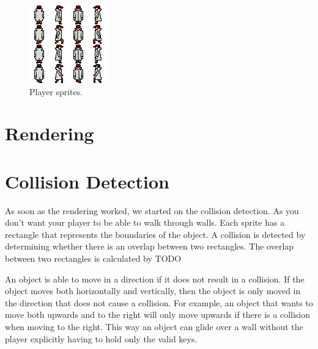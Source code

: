 \documentclass[a4paper,pdf,12pt]{article}
\begin{document}
\begin{figure}[h!]
\centering
\includegraphics[width = 1.0 \textwidth]{../img/player.png}
\caption{Player sprites.}
\label{fig:player}
\end{figure}

\section{Rendering}
\label{sec:Rendering}

\section{Collision Detection}
\label{sec:Collision Detection}
As soon as the rendering worked, we started on the collision detection. As you don't want your player to be able to walk through walls. Each sprite has a rectangle that represents the boundaries of the object. A collision is detected by determining whether there is an overlap between two rectangles. The overlap between two rectangles is calculated by TODO

An object is able to move in a direction if it does not result in a collision. If the object moves both horizontally and vertically, then the object is only moved in the direction that does not cause a collision. For example, an object that wants to move both upwards and to the right will only move upwards if there is a collision when moving to the right. This way an object can glide over a wall without the player explicitly having to hold only the valid keys. 
\end{document}
